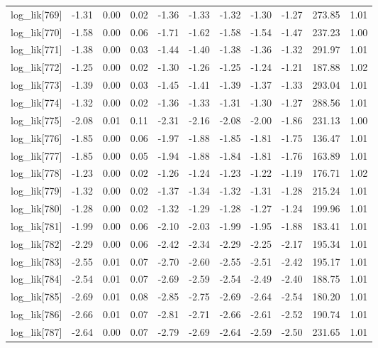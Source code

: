 \begin{table}[ht]
\begin{tabular}{rrrrrrrrrrr}
  log\_lik[769] & -1.31 & 0.00 & 0.02 & -1.36 & -1.33 & -1.32 & -1.30 & -1.27 & 273.85 & 1.01 \\ 
  log\_lik[770] & -1.58 & 0.00 & 0.06 & -1.71 & -1.62 & -1.58 & -1.54 & -1.47 & 237.23 & 1.00 \\ 
  log\_lik[771] & -1.38 & 0.00 & 0.03 & -1.44 & -1.40 & -1.38 & -1.36 & -1.32 & 291.97 & 1.01 \\ 
  log\_lik[772] & -1.25 & 0.00 & 0.02 & -1.30 & -1.26 & -1.25 & -1.24 & -1.21 & 187.88 & 1.02 \\ 
  log\_lik[773] & -1.39 & 0.00 & 0.03 & -1.45 & -1.41 & -1.39 & -1.37 & -1.33 & 293.04 & 1.01 \\ 
  log\_lik[774] & -1.32 & 0.00 & 0.02 & -1.36 & -1.33 & -1.31 & -1.30 & -1.27 & 288.56 & 1.01 \\ 
  log\_lik[775] & -2.08 & 0.01 & 0.11 & -2.31 & -2.16 & -2.08 & -2.00 & -1.86 & 231.13 & 1.00 \\ 
  log\_lik[776] & -1.85 & 0.00 & 0.06 & -1.97 & -1.88 & -1.85 & -1.81 & -1.75 & 136.47 & 1.01 \\ 
  log\_lik[777] & -1.85 & 0.00 & 0.05 & -1.94 & -1.88 & -1.84 & -1.81 & -1.76 & 163.89 & 1.01 \\ 
  log\_lik[778] & -1.23 & 0.00 & 0.02 & -1.26 & -1.24 & -1.23 & -1.22 & -1.19 & 176.71 & 1.02 \\ 
  log\_lik[779] & -1.32 & 0.00 & 0.02 & -1.37 & -1.34 & -1.32 & -1.31 & -1.28 & 215.24 & 1.01 \\ 
  log\_lik[780] & -1.28 & 0.00 & 0.02 & -1.32 & -1.29 & -1.28 & -1.27 & -1.24 & 199.96 & 1.01 \\ 
  log\_lik[781] & -1.99 & 0.00 & 0.06 & -2.10 & -2.03 & -1.99 & -1.95 & -1.88 & 183.41 & 1.01 \\ 
  log\_lik[782] & -2.29 & 0.00 & 0.06 & -2.42 & -2.34 & -2.29 & -2.25 & -2.17 & 195.34 & 1.01 \\ 
  log\_lik[783] & -2.55 & 0.01 & 0.07 & -2.70 & -2.60 & -2.55 & -2.51 & -2.42 & 195.17 & 1.01 \\ 
  log\_lik[784] & -2.54 & 0.01 & 0.07 & -2.69 & -2.59 & -2.54 & -2.49 & -2.40 & 188.75 & 1.01 \\ 
  log\_lik[785] & -2.69 & 0.01 & 0.08 & -2.85 & -2.75 & -2.69 & -2.64 & -2.54 & 180.20 & 1.01 \\ 
  log\_lik[786] & -2.66 & 0.01 & 0.07 & -2.81 & -2.71 & -2.66 & -2.61 & -2.52 & 190.74 & 1.01 \\ 
  log\_lik[787] & -2.64 & 0.00 & 0.07 & -2.79 & -2.69 & -2.64 & -2.59 & -2.50 & 231.65 & 1.01 \\ 

\end{tabular}
\end{table}
